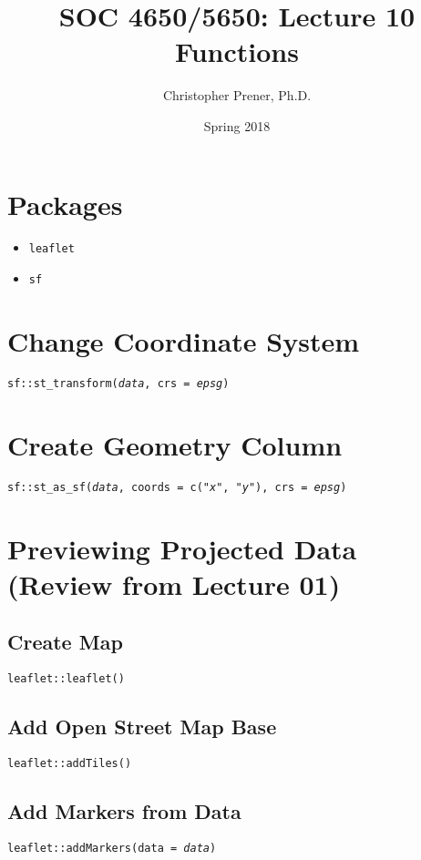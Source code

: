 \documentclass{tufte-handout}
\title{SOC 4650/5650: Lecture 10 Functions}
\author{Christopher Prener, Ph.D.}
\date{Spring 2018}
\newenvironment{subs}
  {\adjustwidth{1em}{0pt}}
  {\endadjustwidth}
\begin{document}
\maketitle %

\vspace{5mm}
\section{Packages}
\begin{itemize}
\item \texttt{leaflet}
\item \texttt{sf}
\end{itemize}

\vspace{5mm}
\section{Change Coordinate System}
\texttt{sf::}{\color{red}\texttt{st\_transform}}\texttt{(\textit{data}, crs = \textit{epsg})}

\vspace{5mm}
\section{Create Geometry Column}
\texttt{sf::}{\color{red}\texttt{st\_as\_sf}}\texttt{(\textit{data}, coords = c("\textit{x}", "\textit{y}"), crs = \textit{epsg})}

\vspace{5mm}
\section{Previewing Projected Data (Review from Lecture 01)}
\begin{subs}
\subsection{Create Map}
\texttt{leaflet::}{\color{red}\texttt{leaflet}}\texttt{()}

\vspace{3mm}
\subsection{Add Open Street Map Base}
\texttt{leaflet::}{\color{red}\texttt{addTiles}}\texttt{()}

\vspace{3mm}
\subsection{Add Markers from Data}
\texttt{leaflet::}{\color{red}\texttt{addMarkers}}\texttt{(data = \textit{data})}
\end{subs}
\end{document}
